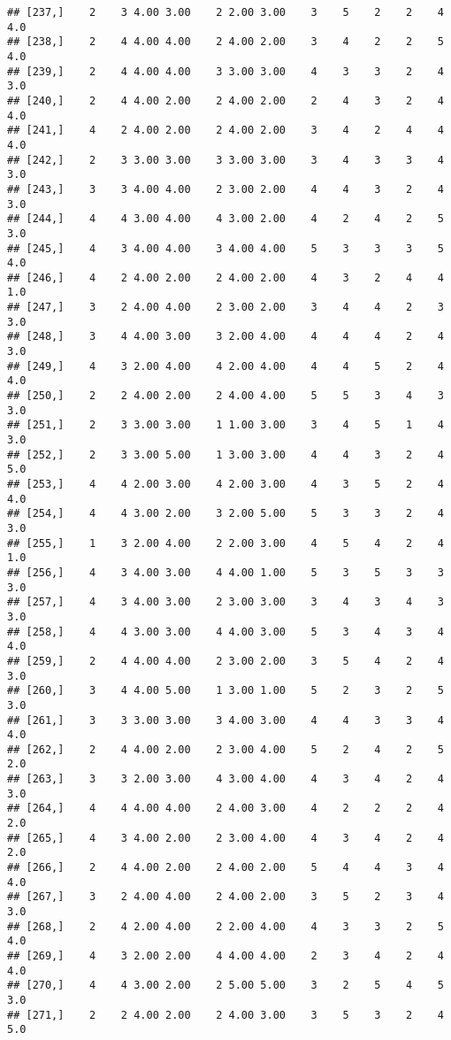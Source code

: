 \documentclass[]{article}
\begin{document}
\begin{verbatim}
## [237,]    2    3 4.00 3.00    2 2.00 3.00    3    5    2    2    4  4.0
## [238,]    2    4 4.00 4.00    2 4.00 2.00    3    4    2    2    5  4.0
## [239,]    2    4 4.00 4.00    3 3.00 3.00    4    3    3    2    4  3.0
## [240,]    2    4 4.00 2.00    2 4.00 2.00    2    4    3    2    4  4.0
## [241,]    4    2 4.00 2.00    2 4.00 2.00    3    4    2    4    4  4.0
## [242,]    2    3 3.00 3.00    3 3.00 3.00    3    4    3    3    4  3.0
## [243,]    3    3 4.00 4.00    2 3.00 2.00    4    4    3    2    4  3.0
## [244,]    4    4 3.00 4.00    4 3.00 2.00    4    2    4    2    5  3.0
## [245,]    4    3 4.00 4.00    3 4.00 4.00    5    3    3    3    5  4.0
## [246,]    4    2 4.00 2.00    2 4.00 2.00    4    3    2    4    4  1.0
## [247,]    3    2 4.00 4.00    2 3.00 2.00    3    4    4    2    3  3.0
## [248,]    3    4 4.00 3.00    3 2.00 4.00    4    4    4    2    4  3.0
## [249,]    4    3 2.00 4.00    4 2.00 4.00    4    4    5    2    4  4.0
## [250,]    2    2 4.00 2.00    2 4.00 4.00    5    5    3    4    3  3.0
## [251,]    2    3 3.00 3.00    1 1.00 3.00    3    4    5    1    4  3.0
## [252,]    2    3 3.00 5.00    1 3.00 3.00    4    4    3    2    4  5.0
## [253,]    4    4 2.00 3.00    4 2.00 3.00    4    3    5    2    4  4.0
## [254,]    4    4 3.00 2.00    3 2.00 5.00    5    3    3    2    4  3.0
## [255,]    1    3 2.00 4.00    2 2.00 3.00    4    5    4    2    4  1.0
## [256,]    4    3 4.00 3.00    4 4.00 1.00    5    3    5    3    3  3.0
## [257,]    4    3 4.00 3.00    2 3.00 3.00    3    4    3    4    3  3.0
## [258,]    4    4 3.00 3.00    4 4.00 3.00    5    3    4    3    4  4.0
## [259,]    2    4 4.00 4.00    2 3.00 2.00    3    5    4    2    4  3.0
## [260,]    3    4 4.00 5.00    1 3.00 1.00    5    2    3    2    5  3.0
## [261,]    3    3 3.00 3.00    3 4.00 3.00    4    4    3    3    4  4.0
## [262,]    2    4 4.00 2.00    2 3.00 4.00    5    2    4    2    5  2.0
## [263,]    3    3 2.00 3.00    4 3.00 4.00    4    3    4    2    4  3.0
## [264,]    4    4 4.00 4.00    2 4.00 3.00    4    2    2    2    4  2.0
## [265,]    4    3 4.00 2.00    2 3.00 4.00    4    3    4    2    4  2.0
## [266,]    2    4 4.00 2.00    2 4.00 2.00    5    4    4    3    4  4.0
## [267,]    3    2 4.00 4.00    2 4.00 2.00    3    5    2    3    4  3.0
## [268,]    2    4 2.00 4.00    2 2.00 4.00    4    3    3    2    5  4.0
## [269,]    4    3 2.00 2.00    4 4.00 4.00    2    3    4    2    4  4.0
## [270,]    4    4 3.00 2.00    2 5.00 5.00    3    2    5    4    5  3.0
## [271,]    2    2 4.00 2.00    2 4.00 3.00    3    5    3    2    4  5.0

\end{verbatim}
\end{document}
